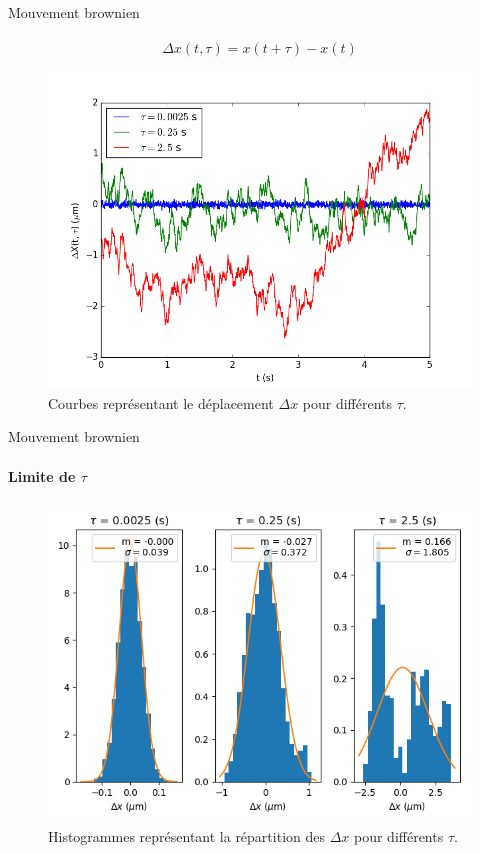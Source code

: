 \documentclass[11pt]{beamer}
\begin{document}
\begin{frame}{Mouvement brownien}
\framesubtitle{}

$$ \Delta x (t, \tau) = x (t + \tau ) - x(t)$$
\begin{figure}
	\centering
	\includegraphics[width=0.7\linewidth]{delta_x_t_tau_}
	\caption{Courbes représentant le déplacement $\Delta x $ pour différents $\tau$.}
	\label{fig:deltaxttau}
\end{figure}
\end{frame}


\begin{frame}{Mouvement brownien}
\framesubtitle{Limite de $\tau$}
\begin{figure}
	\centering
	\includegraphics[width=0.8\linewidth]{collo_histogramme_diff_tau}
	\caption{Histogrammes représentant la répartition des $\Delta x $ pour différents $\tau$.}
	\label{fig:collo_histogramme_diff_tau}
\end{figure}
\end{frame}
\end{document}
